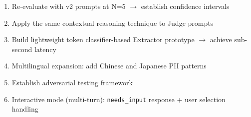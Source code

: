 \documentclass[11pt,a4paper]{article}
\begin{document}
\begin{enumerate}[nosep]
  \item Re-evaluate with v2 prompts at N=5 $\rightarrow$ establish confidence intervals
  \item Apply the same contextual reasoning technique to Judge prompts
  \item Build lightweight token classifier-based Extractor prototype $\rightarrow$ achieve sub-second latency
  \item Multilingual expansion: add Chinese and Japanese PII patterns
  \item Establish adversarial testing framework
  \item Interactive mode (multi-turn): \texttt{needs\_input} response + user selection handling
\end{enumerate}
\end{document}
